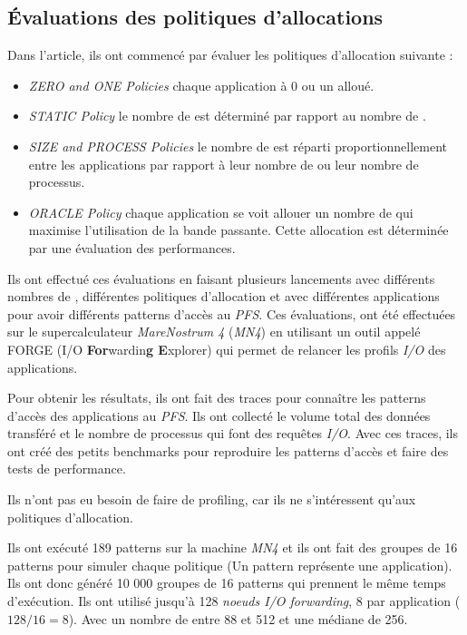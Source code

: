 \documentclass[10pt, a4paper]{article}
\begin{document}
\subsection{Évaluations des politiques d'allocations}

Dans l'article, ils ont commencé par évaluer les politiques d'allocation suivante :
\begin{itemize}
  \item \emph{ZERO and ONE Policies} chaque application à 0 ou un \noeudIO{} alloué.
  \item \emph{STATIC Policy} le nombre de \noeudsIO est déterminé par rapport au nombre de \noeudsDeCalculs{}.
  \item \emph{SIZE and PROCESS Policies} le nombre de \noeudsIO est réparti proportionnellement entre les applications par rapport à leur nombre de \noeudsDeCalculs{} ou leur nombre de processus.
  \item \emph{ORACLE Policy} chaque application se voit allouer un nombre de \noeudsIO qui maximise l'utilisation de la bande passante. Cette allocation est déterminée par une évaluation des performances.
\end{itemize}

Ils ont effectué ces évaluations en faisant plusieurs lancements avec différents nombres de \noeudsIO, différentes politiques d'allocation et avec différentes applications pour avoir différents patterns d'accès au \emph{PFS}. Ces évaluations, ont été effectuées sur le supercalculateur \emph{MareNostrum 4} (\emph{MN4}) en utilisant un outil appelé FORGE (I/O \textbf{For}wardin\textbf{g E}xplorer) qui permet de relancer les profils \emph{I/O} des applications.

Pour obtenir les résultats, ils ont fait des traces pour connaître les patterns d'accès des applications au \emph{PFS}. Ils ont collecté le volume total des données transféré et le nombre de processus qui font des requêtes \emph{I/O}. Avec ces traces, ils ont créé des petits benchmarks pour reproduire les patterns d'accès et faire des tests de performance.

Ils n'ont pas eu besoin de faire de profiling, car ils ne s'intéressent qu'aux politiques d'allocation.

Ils ont exécuté 189 patterns sur la machine \emph{MN4} et ils ont fait des groupes de 16 patterns pour simuler chaque politique (Un pattern représente une application).
Ils ont donc généré 10 000 groupes de 16 patterns qui prennent le même temps d'exécution.
Ils ont utilisé jusqu'à 128 \emph{noeuds I/O forwarding}, 8 par application ($128/16=8$). Avec un nombre de \noeudsDeCalculs{} entre 88 et 512 et une médiane de 256.
\end{document}
